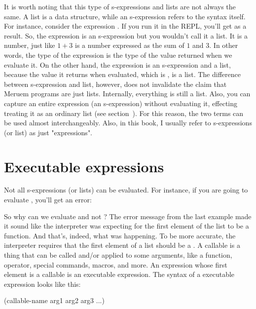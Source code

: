 It is worth noting that this type of s-expressions and lists are not always the same. A list is a data structure, while an s-expression refers to the syntax itself. For instance, consider the expression . If you run it in the REPL, you'll get  as a result. So, the expression  is an s-expression but you wouldn't call it a list. It is a number, just like $1 + 3$ is a number expressed as the sum of $1$ and $3$. In other words, the type of the expression is the type of the value returned when we evaluate it. On the other hand, the expression  is an s-expression and a list, because the value it returns when evaluated, which is , is a list. The difference between s-expression and list, however, does not invalidate the claim that Meruem programs are just lists. Internally, everything is still a list. Also, you can capture an entire expression (an s-expression) without evaluating it, effecting treating it as an ordinary list (see section~). For this reason, the two terms can be used almost interchangeably. Also, in this book, I usually refer to s-expressions (or list) as just "expressions".

\section{Executable expressions}
Not all s-expressions (or lists) can be evaluated. For instance, if you are going to evaluate , you'll get an error:

\begin{REPL}
meruem> (1 2 3)
An error has occurred. 1 can not be converted to a function.
Source: .home.melvic.meruem.meruem.prelude [1:2}]
(1 2 3)
 ^
\end{REPL}

So why can we evaluate  and not ? The error message from the last example made it sound like the interpreter was expecting for the first element of the list to be a function. And that's, indeed, what was happening. To be more accurate, the interpreter requires that the first element of a list should be a . A callable is a thing that can be called and/or applied to some arguments, like a function, operator, special commands, macros, and more. An expression whose first element is a callable is an executable expression. The syntax of a executable expression looks like this:

\begin{QuasiLang}
(callable-name arg1 arg2 arg3 ...)
\end{QuasiLang}


